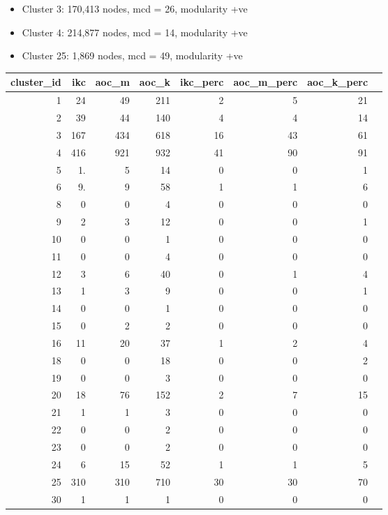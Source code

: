 \documentclass[11pt, oneside]{article}   	%
\begin{document}
\begin{itemize}
\item Cluster 3: 170,413 nodes, mcd = 26, modularity +ve
\item Cluster 4: 214,877 nodes, mcd = 14, modularity +ve
\item Cluster 25: 1,869 nodes, mcd = 49, modularity +ve
\end{itemize}

\begin{table}[ht]
\centering
\begin{tabular}{rrrrrrrr}
  \hline
cluster\_id & ikc & aoc\_m & aoc\_k & ikc\_perc & aoc\_m\_perc & aoc\_k\_perc \\ 
  \hline
1 & 24 &  49 & 211 &   2 &   5 &  21 \\ 
2 & 39 &  44 & 140 &   4 &   4 &  14 \\ 
3 & 167 & 434 & 618 &  16 &  43 &  61 \\ 
4 & 416 & 921 & 932 &  41 &  90 &  91 \\ 
5 & 1. &   5 &  14 &   0 &   0 &   1 \\ 
6 & 9. &   9 &  58 &   1 &   1 &   6 \\ 
8 & 0 &   0 &   4 &   0 &   0 &   0 \\ 
9 & 2 &   3 &  12 &   0 &   0 &   1 \\ 
10 & 0 &   0 &   1 &   0 &   0 &   0 \\ 
11 & 0 &   0 &   4 &   0 &   0 &   0 \\ 
12 & 3 &   6 &  40 &   0 &   1 &   4 \\ 
13 & 1 &   3 &   9 &   0 &   0 &   1 \\ 
14 & 0 &   0 &   1 &   0 &   0 &   0 \\ 
15 & 0 &   2 &   2 &   0 &   0 &   0 \\ 
16 & 11 &  20 &  37 &   1 &   2 &   4 \\ 
18 & 0 &   0 &  18 &   0 &   0 &   2 \\ 
19 & 0 &   0 &   3 &   0 &   0 &   0 \\ 
20 & 18 &  76 & 152 &   2 &   7 &  15 \\ 
21 & 1 &   1 &   3 &   0 &   0 &   0 \\ 
22 & 0 &   0 &   2 &   0 &   0 &   0 \\ 
23 & 0 &   0 &   2 &   0 &   0 &   0 \\ 
24 & 6 &  15 &  52 &   1 &   1 &   5 \\ 
25 & 310 & 310 & 710 &  30 &  30 &  70 \\ 
30 & 1 &   1 &   1 &   0 &   0 &   0 \\ 

\end{tabular}
\end{table}
\end{document}
